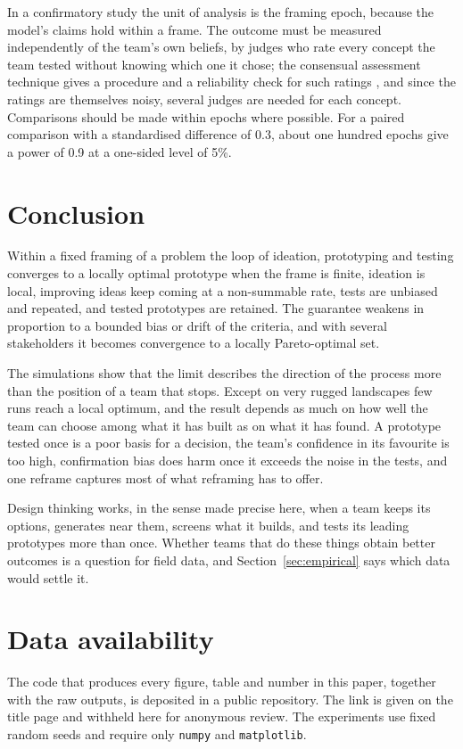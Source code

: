 \documentclass[preprint,review,11pt,authoryear]{elsarticle}
\theoremstyle{definition}
\begin{document}
In a confirmatory study the unit of analysis is the framing epoch, because the model's claims hold within a frame. The outcome must be measured independently of the team's own beliefs, by judges who rate every concept the team tested without knowing which one it chose; the consensual assessment technique gives a procedure and a reliability check for such ratings \citep{amabile1982}, and since the ratings are themselves noisy, several judges are needed for each concept. Comparisons should be made within epochs where possible. For a paired comparison with a standardised difference of 0.3, about one hundred epochs give a power of 0.9 at a one-sided level of 5\%.

\section{Conclusion}

Within a fixed framing of a problem the loop of ideation, prototyping and testing converges to a locally optimal prototype when the frame is finite, ideation is local, improving ideas keep coming at a non-summable rate, tests are unbiased and repeated, and tested prototypes are retained. The guarantee weakens in proportion to a bounded bias or drift of the criteria, and with several stakeholders it becomes convergence to a locally Pareto-optimal set.

The simulations show that the limit describes the direction of the process more than the position of a team that stops. Except on very rugged landscapes few runs reach a local optimum, and the result depends as much on how well the team can choose among what it has built as on what it has found. A prototype tested once is a poor basis for a decision, the team's confidence in its favourite is too high, confirmation bias does harm once it exceeds the noise in the tests, and one reframe captures most of what reframing has to offer.

Design thinking works, in the sense made precise here, when a team keeps its options, generates near them, screens what it builds, and tests its leading prototypes more than once. Whether teams that do these things obtain better outcomes is a question for field data, and Section~\ref{sec:empirical} says which data would settle it.

\section*{Data availability}
The code that produces every figure, table and number in this paper, together with the raw outputs, is deposited in a public repository. The link is given on the title page and withheld here for anonymous review. The experiments use fixed random seeds and require only \texttt{numpy} and \texttt{matplotlib}.
\end{document}

